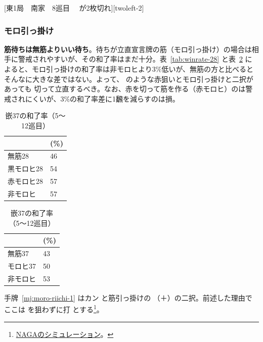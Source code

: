\documentclass[../nankiru_main.tex]{subfiles}
\begin{document}
[東1局　南家　8巡目　 が2枚切れ][twoleft-2]


\subsubsection*{モロ引っ掛け} 

\textbf{筋待ちは無筋よりいい待ち}\citep[][p. 77]{miinin-stat}。待ちが立直宣言牌の筋（モロ引っ掛け）の場合は相手に警戒されやすいが、その和了率はまだ十分。表~\ref{tab:winrate-28} と表~\ref{tab:winrate-37} によると、モロ引っ掛けの和了率は非モロヒより3\%低いが、無筋の方と比べるとそんなに大きな差ではない。よって、 のような赤狙いとモロ引っ掛けと二択があっても  切って立直するべき\citep[][pp. 71--72]{miinin-choice}。なお、赤を切って筋を作る（赤モロヒ）のは警戒されにくいが、3\%の和了率差に1飜を減らすのは損。

\begin{table}[ht]
  \centering
  \begin{minipage}{.48\linewidth}
    \centering
      \begin{tabular}{ll}
        & (\%) \\
        \hline
        無筋28 & 46 \\
        黒モロヒ28 & 54 \\
        赤モロヒ28 & 57 \\
        非モロヒ & 57
      \end{tabular}
      \caption{嵌28の和了率（5〜12巡目）}
      \label{tab:winrate-28}
    \end{minipage}%
  \begin{minipage}{.48\linewidth}
    \centering
    \begin{tabular}{ll}
      & (\%) \\
      \hline
      無筋37 & 43 \\
      モロヒ37 & 50 \\
      非モロヒ & 53 \\
    \end{tabular}
    \caption{嵌37の和了率（5〜12巡目）}
    \label{tab:winrate-37}
  \end{minipage}%
\end{table}

手牌~\ref{mj:moro-riichi-1} はカン  と筋引っ掛けの （＋）の二択。前述した理由でここは  を狙わずに打  とする\footnote{\href{https://naga.dmv.nico/htmls/69d21f40394a565f3ee6a034487617f3dee470af4e003da5777fb99e7349faa2v2_2.html?tw=2}{NAGAのシミュレーション}。}。
\end{document}
